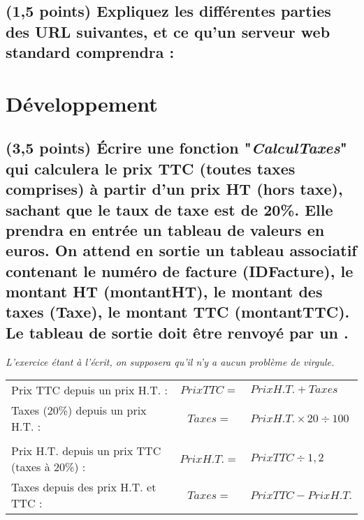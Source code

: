 \documentclass[11pt,a4paper]{article}
\begin{document}
\renewcommand\arraystretch{1}

\newpage

\subsection{(1,5 points) Expliquez les différentes parties des URL suivantes, et ce qu'un serveur web standard comprendra :}

\bigskip


\bigskip
\bigskip
\bigskip
\bigskip
\bigskip
\bigskip
\bigskip
\bigskip
\bigskip
\bigskip


\bigskip
\bigskip
\bigskip
\bigskip
\bigskip
\bigskip
\bigskip
\bigskip
\bigskip
\bigskip

\bigskip
\bigskip
\bigskip
\bigskip
\bigskip
\bigskip
\bigskip
\bigskip
\bigskip
\bigskip

\newpage

\section{Développement}

\subsection{(3,5 points) \'Ecrire une fonction "\textit{CalculTaxes}" qui calculera le prix TTC (toutes taxes comprises) à partir d'un prix HT (hors taxe), sachant que le taux de taxe est de 20\%. Elle prendra en entrée un tableau de valeurs en euros. On attend en sortie un tableau associatif contenant le numéro de facture (IDFacture), le montant HT (montantHT), le montant des taxes (Taxe), le montant TTC (montantTTC). Le tableau de sortie \text doit être renvoyé par un .}

\medskip

\textit{L'exercice étant à l'écrit, on supposera qu'il n'y a aucun problème de virgule.}

\medskip

\begin{tabular}{l c l}
Prix TTC depuis un prix H.T. : & $ Prix TTC = $ & $ Prix H.T. + Taxes $ \\
Taxes (20\%) depuis un prix H.T. : & $ Taxes = $ & $ Prix H.T. \times 20 \div 100 $ \\
 & & \\
Prix H.T. depuis un prix TTC (taxes à 20\%) : & $ Prix H.T. = $ & $ Prix TTC \div 1,2 $ \\
Taxes depuis des prix H.T. et TTC : & $ Taxes = $ & $ Prix TTC - Prix H.T. $ \\
\end{tabular}
\end{document}

